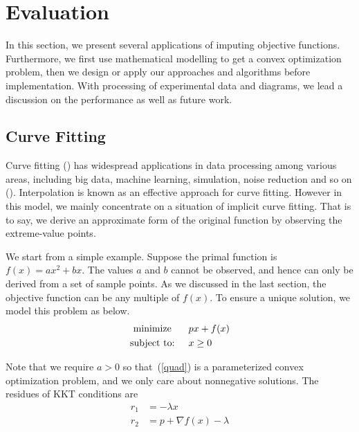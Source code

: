 \section{Evaluation}\label{sec:evaluation}

In this section, we present several applications of imputing objective functions. Furthermore, we first use mathematical modelling to get a convex optimization problem, then we design or apply our approaches and algorithms before implementation. With processing of experimental data and diagrams, we lead a discussion on the performance as well as future work.

\subsection{Curve Fitting}

Curve fitting () has widespread applications in data processing among various areas, including big data, machine learning, simulation, noise reduction and so on (). Interpolation is known as an effective approach for curve fitting. However in this model, we mainly concentrate on a situation of implicit curve fitting. That is to say, we derive an approximate form of the original function by observing the extreme-value points.

We start from a simple example. Suppose the primal function is $f(x)=ax^2+bx$. The values $a$ and $b$ cannot be observed, and hence can only be derived from a set of sample points. As we discussed in the last section, the objective function can be any multiple of $f(x)$. To ensure a unique solution, we model this problem as below.
\begin{align}
\begin{split}\label{quad}
\textrm{minimize }\hspace{.2in}&px+f(x)\\
\textrm{subject to:}\hspace{.2in}&x\ge0
\end{split}
\end{align}

Note that we require $a>0$ so that~(\ref{quad}) is a parameterized convex optimization problem, and we only care about nonnegative solutions. The residues of KKT conditions are
\begin{align*}
r_1 &= -\lambda x\\
r_2 &= p+\nabla f(x)-\lambda
\end{align*}

